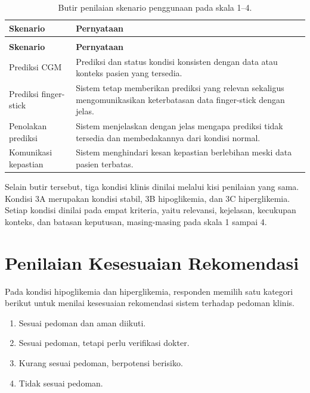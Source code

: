 \begingroup
\setlength{\LTcapwidth}{\textwidth}
\begin{longtable}{@{}>{\raggedright\arraybackslash}p{2.300cm}>{\raggedright\arraybackslash}p{11.278cm}@{}}
\caption{Butir penilaian skenario penggunaan pada skala 1--4.}
\label{tab:lampC-skenario} \\
\toprule
\textbf{Skenario} & \textbf{Pernyataan} \\
\midrule
\endfirsthead

\multicolumn{2}{@{}l}{\small\emph{Tabel \thetable{} (lanjutan)}} \\
\toprule
\textbf{Skenario} & \textbf{Pernyataan} \\
\midrule
\endhead

\bottomrule
\endlastfoot

Prediksi CGM & Prediksi dan status kondisi konsisten dengan data atau konteks pasien yang tersedia. \\

Prediksi finger-stick & Sistem tetap memberikan prediksi yang relevan sekaligus mengomunikasikan keterbatasan data finger-stick dengan jelas. \\

Penolakan prediksi & Sistem menjelaskan dengan jelas mengapa prediksi tidak tersedia dan membedakannya dari kondisi normal. \\

Komunikasi kepastian & Sistem menghindari kesan kepastian berlebihan meski data pasien terbatas. \\
\end{longtable}
\endgroup

Selain butir tersebut, tiga kondisi klinis dinilai melalui kisi penilaian yang sama. Kondisi 3A merupakan kondisi stabil, 3B hipoglikemia, dan 3C hiperglikemia.
Setiap kondisi dinilai pada empat kriteria, yaitu relevansi, kejelasan, kecukupan konteks, dan batasan keputusan, masing-masing pada skala 1 sampai 4.

\section{Penilaian Kesesuaian Rekomendasi}
\label{lamp:instrumen-rekomendasi}

Pada kondisi hipoglikemia dan hiperglikemia, responden memilih satu kategori berikut untuk menilai kesesuaian rekomendasi sistem terhadap pedoman klinis.

\begin{enumerate}
    \item Sesuai pedoman dan aman diikuti.
    \item Sesuai pedoman, tetapi perlu verifikasi dokter.
    \item Kurang sesuai pedoman, berpotensi berisiko.
    \item Tidak sesuai pedoman.
\end{enumerate}

